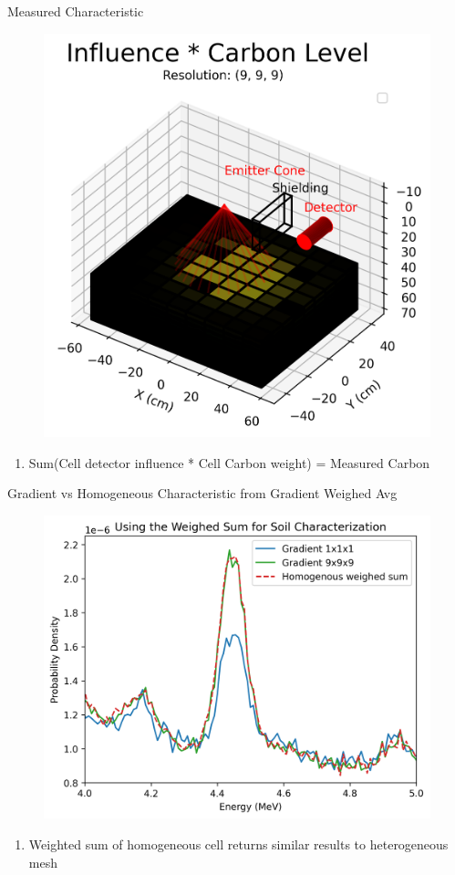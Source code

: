 \documentclass[10pt,hyperref={colorlinks,citecolor=blue,urlcolor=peking_blue,linkcolor=}]{beamer}
\theoremstyle{plain}
\begin{document}
\begin{frame}{Measured Characteristic}
\begin{figure}[Influence Times Carbon Level]
\begin{center}
\includegraphics[width=.5\linewidth]{../Figures/MCNP/InfluenceTimesCarbonLevel.png}
\end{center}
\end{figure}
\begin{enumerate}
\item Sum(Cell detector influence * Cell Carbon weight) = Measured Carbon
\end{enumerate}
\end{frame}
\begin{frame}{Gradient vs Homogeneous Characteristic from Gradient Weighed Avg}
\begin{figure}[Gradient Weighed Avg vs Homogeneous Avg]
\begin{center}
\includegraphics[width=.5\linewidth]{../Figures/MCNP/GradientWeighedAvgvsHomogeneousAvg.png}
\end{center}
\end{figure}
\begin{enumerate}
\item Weighted sum of homogeneous cell returns similar results to heterogeneous mesh
\end{enumerate}
\end{frame}
\end{document}
